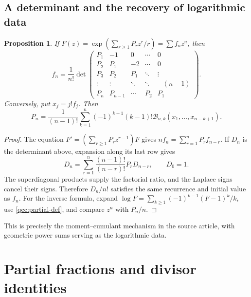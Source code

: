 \documentclass[11pt,a4paper,oneside,openany]{book}
\newtheorem{proposition}[theorem]{Proposition}
\theoremstyle{definition}
\theoremstyle{remark}
\newcommand{\B}[2]{\mathcal B_{#1,#2}}
\begin{document}
\section{A determinant and the recovery of logarithmic data}
\begin{proposition}\label{qcc:determinant}
If \(F(z)=\exp(\sum_{r\ge1}P_rz^r/r)=\sum f_nz^n\), then
\begin{equation}\label{qcc:det-formula}
 f_n=\frac1{n!}
 \det\begin{pmatrix}
 P_1&-1&0&\cdots&0\\
 P_2&P_1&-2&\cdots&0\\
 P_3&P_2&P_1&\ddots&\vdots\\
 \vdots&\vdots&\ddots&\ddots&-(n-1)\\
 P_n&P_{n-1}&\cdots&P_2&P_1
 \end{pmatrix}.
\end{equation}
Conversely, put \(x_j=j!f_j\). Then
\begin{equation}\label{qcc:inverse-bell-log}
 P_n=\frac1{(n-1)!}\sum_{k=1}^n(-1)^{k-1}(k-1)!
                   \B nk(x_1,\ldots,x_{n-k+1}).
\end{equation}
\end{proposition}
\begin{proof}
The equation \(F'=(\sum_{r\ge1}P_rz^{r-1})F\) gives
\(nf_n=\sum_{r=1}^nP_rf_{n-r}\). If \(D_n\) is the determinant above, expansion
along its last row gives
\[
 D_n=\sum_{r=1}^n\frac{(n-1)!}{(n-r)!}P_rD_{n-r},\qquad D_0=1.
\]
The superdiagonal products supply the factorial ratio, and the Laplace signs
cancel their signs. Therefore \(D_n/n!\) satisfies the same recurrence and
initial value as \(f_n\).
For the inverse formula, expand
\(\log F=\sum_{k\ge1}(-1)^{k-1}(F-1)^k/k\), use
\eqref{qcc:partial-def}, and compare \(z^n\) with \(P_n/n\).
\end{proof}
This is precisely the moment--cumulant mechanism in the source article, with
geometric power sums serving as the logarithmic data.

\chapter{Partial fractions and divisor identities}
\label{qcc:divisor}
\end{document}
